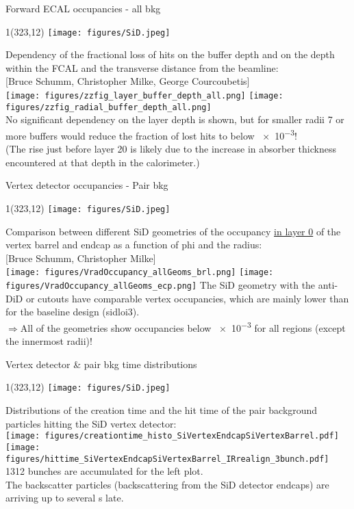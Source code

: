 \documentclass[xcolor={dvipsnames}]{beamer}
\newcommand{\sidlogo}{
  \setlength{\TPHorizModule}{1pt}
  \setlength{\TPVertModule}{1pt}
  \begin{textblock}{1}(323,12)
   \texttt{[image: figures/SiD.jpeg]}
  \end{textblock}
  }
\begin{document}
\begin{frame}{Forward ECAL occupancies - all bkg}
\sidlogo
Dependency of the fractional loss of hits on the buffer depth and on the depth within the FCAL and the transverse distance from the beamline:\\
\flushright \tiny [Bruce Schumm, Christopher Milke, George Courcoubetis]\\
 \texttt{[image: figures/zzfig\_layer\_buffer\_depth\_all.png]}
\texttt{[image: figures/zzfig\_radial\_buffer\_depth\_all.png]}\\
\flushleft \normalsize No significant dependency on the layer depth is shown, but for smaller radii 7 or more buffers would reduce the fraction of lost hits to below \num{e-3}!\\ 
\tiny (The rise just before layer 20 is likely due to the increase in absorber thickness encountered at that depth in the calorimeter.)
\end{frame}

\begin{frame}{Vertex detector occupancies - Pair bkg}
\sidlogo
Comparison between different SiD geometries of the occupancy \underline{in layer 0}  of the vertex barrel and endcap as a function of phi and the radius:\\
\flushright \tiny [Bruce Schumm, Christopher Milke]\\
\texttt{[image: figures/VradOccupancy\_allGeoms\_brl.png]}
\texttt{[image: figures/VradOccupancy\_allGeoms\_ecp.png]}
\flushleft \normalsize The SiD geometry with the anti-DiD or cutouts have comparable vertex occupancies, which are mainly lower than for the baseline design (sidloi3).\\
$\Rightarrow$All of the geometries show occupancies below \num{e-3} for all regions (except the innermost radii)!
\end{frame}

\begin{frame}{Vertex detector \& pair bkg time distributions}
\sidlogo
Distributions of the creation time and the hit time of the pair background particles hitting the SiD vertex detector:\\
\texttt{[image: figures/creationtime\_histo\_SiVertexEndcapSiVertexBarrel.pdf]}
\texttt{[image: figures/hittime\_SiVertexEndcapSiVertexBarrel\_IRrealign\_3bunch.pdf]}\\

\small 1312 bunches are accumulated for the left plot.\\
\normalsize The backscatter particles (backscattering from the SiD detector endcaps) are arriving up to several \textmu s late. 
\end{frame}
\end{document}

